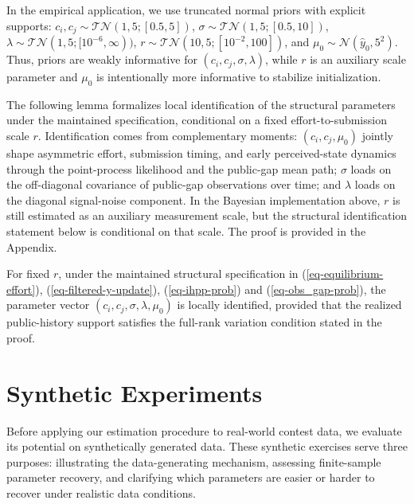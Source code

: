 \documentclass[mnsc]{informs3}
\begin{document}
In the empirical application, we use truncated normal priors with explicit supports:
$c_i,c_j\sim\mathcal{TN}(1,5;[0.5,5])$,
$\sigma\sim\mathcal{TN}(1,5;[0.5,10])$,
$\lambda\sim\mathcal{TN}(1,5;[10^{-6},\infty))$,
$r\sim\mathcal{TN}(10,5;[10^{-2},100])$,
and $\mu_0\sim\mathcal{N}(\hat{y}_0,5^2)$.
Thus, priors are weakly informative for $(c_i,c_j,\sigma,\lambda)$, while $r$ is an auxiliary scale parameter and $\mu_0$ is intentionally more informative to stabilize initialization.


The following lemma formalizes local identification of the structural parameters under the maintained specification, conditional on a fixed effort-to-submission scale $r$.
Identification comes from complementary moments: $(c_i,c_j,\mu_0)$ jointly shape asymmetric effort, submission timing, and early perceived-state dynamics through the point-process likelihood and the public-gap mean path; $\sigma$ loads on the off-diagonal covariance of public-gap observations over time; and $\lambda$ loads on the diagonal signal-noise component.
In the Bayesian implementation above, $r$ is still estimated as an auxiliary measurement scale, but the structural identification statement below is conditional on that scale.
The proof is provided in the Appendix.

\begin{lemma}
\label{lmm-params-identifiability}
For fixed $r$, under the maintained structural specification in (\ref{eq-equilibrium-effort}), (\ref{eq-filtered-y-update}), (\ref{eq-ihpp-prob}) and (\ref{eq-obs_gap-prob}), the parameter vector $(c_i,c_j,\sigma,\lambda,\mu_0)$ is locally identified, provided that the realized public-history support satisfies the full-rank variation condition stated in the proof.
\end{lemma}


\section{Synthetic Experiments}\label{sect-synthetic}

Before applying our estimation procedure to real-world contest data, we evaluate its potential on synthetically generated data.
These synthetic exercises serve three purposes: illustrating the data-generating mechanism, assessing finite-sample parameter recovery, and clarifying which parameters are easier or harder to recover under realistic data conditions.
\end{document}
